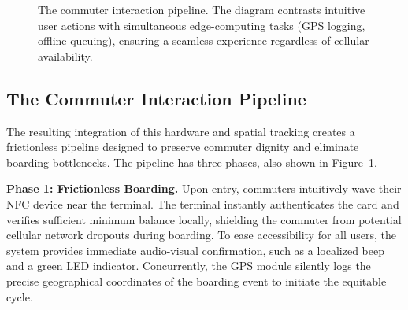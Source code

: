 \documentclass[manuscript,review,anonymous]{acmart}
\begin{document}
\begin{figure}[t]
  \caption{The commuter interaction pipeline. The diagram contrasts intuitive user actions with simultaneous edge-computing tasks (GPS logging, offline queuing), ensuring a seamless experience regardless of cellular availability.}
  \label{fig:user_flow}
\end{figure}

\subsection{The Commuter Interaction Pipeline}
The resulting integration of this hardware and spatial tracking creates a frictionless pipeline designed to preserve commuter dignity and eliminate boarding bottlenecks. The pipeline has three phases, also shown in Figure~\ref{fig:user_flow}.

\textbf{Phase 1: Frictionless Boarding.} Upon entry, commuters intuitively wave their NFC device near the terminal. The terminal instantly authenticates the card and verifies sufficient minimum balance locally, shielding the commuter from potential cellular network dropouts during boarding. To ease accessibility for all users, the system provides immediate audio-visual confirmation, such as a localized beep and a green LED indicator. Concurrently, the GPS module silently logs the precise geographical coordinates of the boarding event to initiate the equitable cycle.
\end{document}

